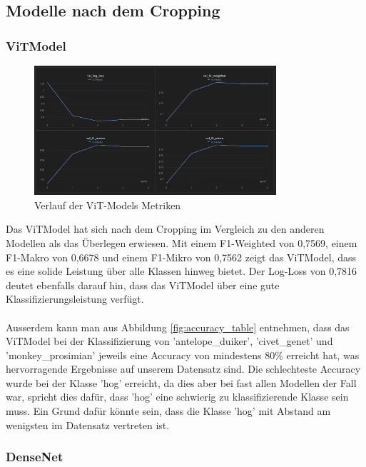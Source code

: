 \documentclass{article}
\begin{document}
\subsection{Modelle nach dem Cropping}

\subsubsection{ViTModel}

\begin{figure}[!h]
    \centering
    \includegraphics[width=0.8\textwidth]{plots/ViT_Model_wandb.png}
    \caption{\label{fig:wb_vitmodel}Verlauf der ViT-Models Metriken}
\end{figure}

Das ViTModel hat sich nach dem Cropping im Vergleich zu den anderen Modellen als das Überlegen erwiesen. Mit einem F1-Weighted von 0,7569, einem F1-Makro von 0,6678 und einem F1-Mikro von 0,7562 zeigt das ViTModel, dass es eine solide Leistung über alle Klassen hinweg bietet. Der Log-Loss von 0,7816 deutet ebenfalls darauf hin, dass das ViTModel über eine gute Klassifizierungsleistung verfügt.\\\\
Ausserdem kann man aus Abbildung \ref{fig:accuracy_table} entnehmen, dass das ViTModel bei der Klassifizierung von 'antelope\_duiker', 'civet\_genet' und 'monkey\_prosimian' jeweils eine Accuracy von mindestens 80\% erreicht hat, was hervorragende Ergebnisse auf unserem Datensatz sind. Die schlechteste Accuracy wurde bei der Klasse 'hog' erreicht, da dies aber bei fast allen Modellen der Fall war, spricht dies dafür, dass 'hog' eine schwierig zu klassifizierende Klasse sein muss. Ein Grund dafür könnte sein, dass die Klasse 'hog' mit Abstand am wenigsten im Datensatz vertreten ist.

\newpage

\subsubsection{DenseNet}
\end{document}
